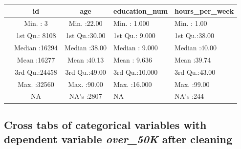 \documentclass[]{article}
\newenvironment{Shaded}{\begin{snugshade}}{\end{snugshade}}
\newcommand{\DataTypeTok}[1]{\textcolor[rgb]{0.13,0.29,0.53}{#1}}
\newcommand{\KeywordTok}[1]{\textcolor[rgb]{0.13,0.29,0.53}{\textbf{#1}}}
\newcommand{\NormalTok}[1]{#1}
\newcommand{\OperatorTok}[1]{\textcolor[rgb]{0.81,0.36,0.00}{\textbf{#1}}}
\newcommand{\StringTok}[1]{\textcolor[rgb]{0.31,0.60,0.02}{#1}}
\begin{document}
\begin{longtable}[]{@{}lccll@{}}
\toprule
& id & age & education\_num & hours\_per\_week\tabularnewline
\midrule
\endhead
& Min. : 3 & Min. :22.00 & Min. : 1.000 & Min. : 1.00\tabularnewline
& 1st Qu.: 8108 & 1st Qu.:30.00 & 1st Qu.: 9.000 & 1st
Qu.:38.00\tabularnewline
& Median :16294 & Median :38.00 & Median : 9.000 & Median
:40.00\tabularnewline
& Mean :16277 & Mean :40.13 & Mean : 9.636 & Mean :39.74\tabularnewline
& 3rd Qu.:24458 & 3rd Qu.:49.00 & 3rd Qu.:10.000 & 3rd
Qu.:43.00\tabularnewline
& Max. :32560 & Max. :90.00 & Max. :16.000 & Max. :99.00\tabularnewline
& NA & NA's :2807 & NA & NA's :244\tabularnewline
\bottomrule
\end{longtable}

\hypertarget{cross-tabs-of-categorical-variables-with-dependent-variable-over_50k-after-cleaning}{%
\subsection{\texorpdfstring{Cross tabs of categorical variables with
dependent variable \emph{over\_50K} after
cleaning}{Cross tabs of categorical variables with dependent variable over\_50K after cleaning}}\label{cross-tabs-of-categorical-variables-with-dependent-variable-over_50k-after-cleaning}}

\begin{Shaded}
\end{Shaded}
\end{document}
